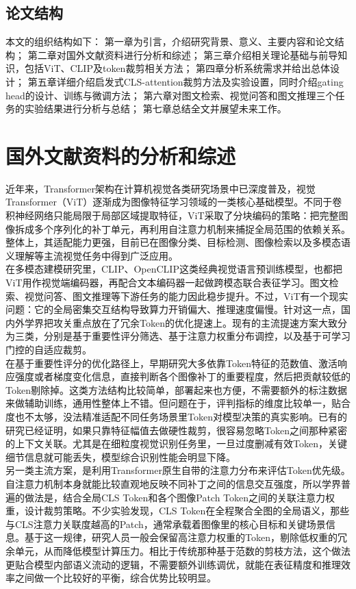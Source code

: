\documentclass{article}
\begin{document}
{{{		\subsection{论文结构}
		{\setlength{\parindent}{2em}\setlength{\baselineskip}{20pt}\selectfont
			本文的组织结构如下：
			第一章为引言，介绍研究背景、意义、主要内容和论文结构；
			第二章对国外文献资料进行分析和综述；
			第三章介绍相关理论基础与前导知识，包括ViT、CLIP及token裁剪相关方法；
			第四章分析系统需求并给出总体设计；
			第五章详细介绍启发式CLS-attention裁剪方法及实验设置，同时介绍gating head的设计、训练与微调方法；
			第六章对图文检索、视觉问答和图文推理三个任务的实验结果进行分析与总结；
			第七章总结全文并展望未来工作。
	\section{国外文献资料的分析和综述}
	{\setlength{\parindent}{2em}\setlength{\baselineskip}{20pt}\selectfont
		近年来，Transformer架构在计算机视觉各类研究场景中已深度普及，视觉Transformer（ViT）逐渐成为图像特征学习领域的一类核心基础模型。不同于卷积神经网络只能局限于局部区域提取特征，ViT采取了分块编码的策略：把完整图像拆成多个序列化的补丁单元，再利用自注意力机制来捕捉全局范围的依赖关系。整体上，其适配能力更强，目前已在图像分类、目标检测、图像检索以及多模态语义理解等主流视觉任务中得到广泛应用。\\
		在多模态建模研究里，CLIP、OpenCLIP这类经典视觉语言预训练模型，也都把ViT用作视觉端编码器，再配合文本编码器一起做跨模态联合表征学习。图文检索、视觉问答、图文推理等下游任务的能力因此稳步提升。不过，ViT有一个现实问题：它的全局密集交互结构导致算力开销偏大、推理速度偏慢。针对这一点，国内外学界把攻关重点放在了冗余Token的优化提速上。现有的主流提速方案大致分为三类，分别是基于重要性评分筛选、基于注意力权重分布调控，以及基于可学习门控的自适应裁剪。\\
		在基于重要性评分的优化路径上，早期研究大多依靠Token特征的范数值、激活响应强度或者梯度变化信息，直接判断各个图像补丁的重要程度，然后把贡献较低的Token剔除掉。这类方法结构比较简单，部署起来也方便，不需要额外的标注数据来做辅助训练，通用性整体上不错。但问题在于，评判指标的维度比较单一，贴合度也不太够，没法精准适配不同任务场景里Token对模型决策的真实影响。已有的研究已经证明，如果只靠特征幅值去做硬性裁剪，很容易忽略Token之间那种紧密的上下文关联。尤其是在细粒度视觉识别任务里，一旦过度删减有效Token，关键细节信息就可能丢失，模型综合识别性能会明显下降。\\
		另一类主流方案，是利用Transformer原生自带的注意力分布来评估Token优先级。自注意力机制本身就能比较直观地反映不同补丁之间的信息交互强度，所以学界普遍的做法是，结合全局CLS Token和各个图像Patch Token之间的关联注意力权重，设计裁剪策略。不少实验发现，CLS Token在全程聚合全图的全局语义，那些与CLS注意力关联度越高的Patch，通常承载着图像里的核心目标和关键场景信息。基于这一规律，研究人员一般会保留高注意力权重的Token，剔除低权重的冗余单元，从而降低模型计算压力。相比于传统那种基于范数的剪枝方法，这个做法更贴合模型内部语义流动的逻辑，不需要额外训练调优，就能在表征精度和推理效率之间做一个比较好的平衡，综合优势比较明显。\\
}}}}}
\end{document}
